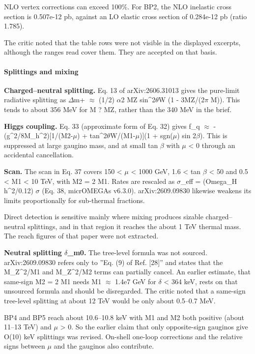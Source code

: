 \documentclass[11pt,a4paper]{article}
\begin{document}
NLO vertex corrections can exceed 100\%. For BP2, the NLO inelastic cross section is 0.507e-12 pb, against an LO elastic cross section of 0.284e-12 pb (ratio 1.785).

The critic noted that the table rows were not visible in the displayed excerpts, although the ranges read cover them. They are accepted on that basis.

\paragraph{Splittings and mixing}
\textbf{Charged--neutral splitting.} Eq. 13 of arXiv:2606.31013 gives the pure-limit radiative splitting as $\Delta$m+ $\approx$ (1/2) $\alpha$2 MZ sin\textasciicircum{}2$\theta$W (1 - 3MZ/(2$\pi$ M)). This tends to about 356 MeV for M ? MZ, rather than the 340 MeV in the brief.

\textbf{Higgs coupling.} Eq. 33 (approximate form of Eq. 32) gives f\_q $\approx$ -(g\textasciicircum{}2/8M\_h\textasciicircum{}2)[1/(M2-\textbar{}$\mu$\textbar{}) + tan\textasciicircum{}2$\theta$W/(M1-\textbar{}$\mu$\textbar{})](1 + sgn($\mu$) sin 2$\beta$). This is suppressed at large gaugino mass, and at small tan $\beta$ with $\mu$ \textless{} 0 through an accidental cancellation.

\textbf{Scan.} The scan in Eq. 37 covers 150 \textless{} \textbar{}$\mu$\textbar{} \textless{} 1000 GeV, 1.6 \textless{} tan $\beta$ \textless{} 50 and 0.5 \textless{} M1 \textless{} 10 TeV, with M2 = 2 M1. Rates are rescaled as $\sigma$\_eff = (Omega\_H h\textasciicircum{}2/0.12) $\sigma$ (Eq. 38, micrOMEGAs v6.3.0). arXiv:2609.09830 likewise weakens its limits proportionally for sub-thermal fractions.

Direct detection is sensitive mainly where mixing produces sizable charged--neutral splittings, and in that region it reaches the about 1 TeV thermal mass. The reach figures of that paper were not extracted.

\textbf{Neutral splitting $\delta$\_m0.} The tree-level formula was not sourced. arXiv:2609.09830 refers only to ''Eq. (9) of Ref. [28]'' and states that the M\_Z\textasciicircum{}2/M1 and M\_Z\textasciicircum{}2/M2 terms can partially cancel. An earlier estimate, that same-sign M2 = 2 M1 needs M1 $\approx$ 1.4e7 GeV for $\delta$ \textless{} 364 keV, rests on that unsourced formula and should be disregarded. The critic noted that a same-sign tree-level splitting at about 12 TeV would be only about 0.5--0.7 MeV.

BP4 and BP5 reach about 10.6--10.8 keV with M1 and M2 both positive (about 11--13 TeV) and $\mu$ \textgreater{} 0. So the earlier claim that only opposite-sign gauginos give O(10) keV splittings was revised. On-shell one-loop corrections and the relative signs between $\mu$ and the gauginos also contribute.
\end{document}
